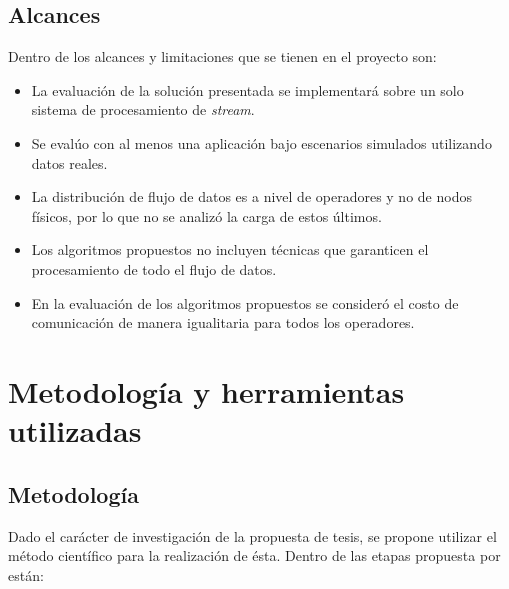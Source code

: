 \subsection{Alcances}
Dentro de los alcances y limitaciones que se tienen en el proyecto son:
\begin{itemize}
	\item La evaluación de la solución presentada se implementará sobre un solo sistema de procesamiento de \textit{stream}.
	\item Se evalúo con al menos una aplicación bajo escenarios simulados utilizando datos reales.
	\item La distribución de flujo de datos es a nivel de operadores y no de nodos f\'isicos, por lo que no se analizó la carga de estos \'ultimos.
	\item Los algoritmos propuestos no incluyen t\'ecnicas que garanticen el procesamiento de todo el flujo de datos.
	\item En la evaluación de los algoritmos propuestos se consideró el costo de comunicación de manera igualitaria para todos los operadores.
\end{itemize}


\section{Metodología y herramientas utilizadas}
\label{intro:metodologia}

\subsection{Metodología}
Dado el carácter de investigación de la propuesta de tesis, se propone utilizar el método científico para la realización de ésta. Dentro de las etapas propuesta por \citep{hernandez2010metodologia} están:

